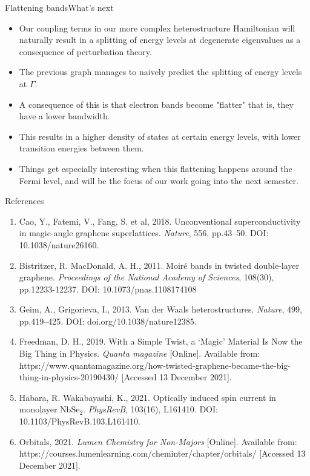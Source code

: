 \documentclass[9pt]{beamer}
\begin{document}
\begin{frame}{Flattening bands}{What's next}
  \begin{itemize}
    \item Our coupling terms in our more complex heterostructure Hamiltonian will naturally result in a splitting of energy levels at degenerate eigenvalues as a consequence of perturbation theory.

    \item The previous graph manages to naively predict the splitting of energy levels at $\Gamma$.

    \item A consequence of this is that electron bands become "flatter" that is, they have a lower bandwidth.

    \item This results in a higher density of states at certain energy levels, with lower transition energies between them.

    \item Things get especially interesting when this flattening happens around the Fermi level, and will be the focus of our work going into the next semester.
  \end{itemize}
\end{frame}

\begin{frame}{References}
  \begin{enumerate}
    \item Cao, Y., Fatemi, V., Fang, S. et al, 2018. Unconventional superconductivity in magic-angle graphene superlattices. \textit{Nature}, 556, pp.43–50. DOI: 10.1038/nature26160.
    \item Bistritzer, R. MacDonald, A. H., 2011. Moiré bands in twisted double-layer graphene. \textit{Proceedings of the National Academy of Sciences}, 108(30), pp.12233-12237. DOI: 10.1073/pnas.1108174108
    \item Geim, A., Grigorieva, I., 2013. Van der Waals heterostructures. \textit{Nature}, 499, pp.419–425. DOI: doi.org/10.1038/nature12385.
    \item Freedman, D. H., 2019. With a Simple Twist, a ‘Magic’ Material Is Now the Big Thing in Physics. \textit{Quanta magazine} [Online]. Available from: https://www.quantamagazine.org/how-twisted-graphene-became-the-big-thing-in-physics-20190430/ [Accessed 13 December 2021].
    \item Habara, R. Wakabayashi, K., 2021. Optically induced spin current in monolayer ${\mathrm{NbSe}}_{2}$. \textit{PhysRevB}, 103(16), L161410. DOI: 10.1103/PhysRevB.103.L161410.
    \item  Orbitals, 2021. \textit{Lumen Chemistry for Non-Majors} [Online]. Available from: https://courses.lumenlearning.com/cheminter/chapter/orbitals/ [Accessed 13 December 2021].
  \end{enumerate}
\end{frame}
\end{document}

